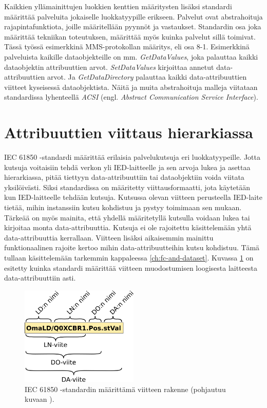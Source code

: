 Kaikkien yllämainittujen luokkien kenttien määritysten lisäksi standardi määrittää palveluita jokaiselle luokkatyypille erikseen. Palvelut ovat abstrahoituja rajapintafunktiota, joille määritellään pyynnöt ja vastaukset. Standardin osa joka määrittää tekniikan toteutuksen, määrittää myös kuinka palvelut sillä toimivat. Tässä työssä esimerkkinä MMS-protokollan määritys, eli osa 8-1. Esimerkkinä palveluista kaikille dataobjekteille on mm. \emph{GetDataValues}, joka palauttaa kaikki dataobjektin attribuuttien arvot. \emph{SetDataValues} kirjoittaa annetut data-att\-ri\-buut\-ti\-en arvot. Ja \emph{GetDataDirectory} palauttaa kaikki data-att\-ri\-buut\-ti\-en viitteet kyseisessä dataobjektista. Näitä ja muita abstrahoituja malleja viitataan standardissa lyhenteellä \emph{ACSI} (engl. \emph{Abstract Communication Service Interface}). \mbox{\cite[s.~15, 45--46]{IEC61850-7-2}} \mbox{\cite[s.~26]{IEC61850-7-1}}


\section{Attribuuttien viittaus hierarkiassa}
IEC 61850 -standardi määrittää erilaisia palvelukutsuja eri luokkatyypeille. Jotta kutsuja voitaisiin tehdä verkon yli IED-laitteelle ja sen arvoja lukea ja asettaa hierarkiassa, pitää tiettyyn data-attribuuttiin tai dataobjektiin voida viitata yksilöivästi. Siksi standardissa on määritetty viittausformaatti, jota käytetään kun IED-laitteelle tehdään kutsuja. Kutsussa olevan viitteen perusteella IED-laite tietää, mihin instanssiin kutsu kohdistuu ja pystyy toimimaan sen mukaan. Tärkeää on myös mainita, että yhdellä määritetyllä kutsulla voidaan lukea tai kirjoitaa monta data-attribuuttia. Kutsuja ei ole rajoitettu käsittelemään yhtä data-attribuuttia kerrallaan. Viitteen lisäksi aikaisemmin mainittu funktionaalinen rajoite kertoo mihin data-attribuutteihin kutsu kohdistuu. Tämä tullaan käsittelemään tarkemmin kappaleessa \ref{ch:fc-and-dataset}. Kuvassa \ref{fig:iec61850-data-reference} on esitetty kuinka standardi määrittää viitteen muodostumisen loogisesta laitteesta data-attribuuttiin asti. \mbox{\cite[s.~625--626]{Mackiewicz2006}}

\begin{figure}[ht!]
	\includegraphics[width=0.5\textwidth]{pictures/iec61850-data-reference.png}
	\caption{IEC 61850 -standardin määrittämä viitteen rakenne (pohjautuu kuvaan \mbox{\cite[s.~93]{IEC61850-7-1}}).}
	\label{fig:iec61850-data-reference}
\end{figure}

